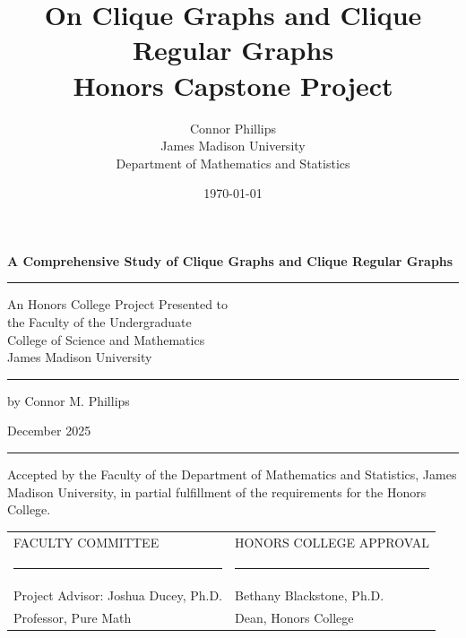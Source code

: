 \documentclass[12pt]{report}
\title{\Huge On Clique Graphs and Clique Regular Graphs \\[1em]
\Large  Honors Capstone Project}
\author{Connor Phillips \\[0.5em]
James Madison University\\
Department of Mathematics and Statistics}
\date{\today}
\theoremstyle{definition}
\begin{document}
\begin{titlepage}
\centering

{\large\bfseries
A Comprehensive Study of Clique Graphs and Clique Regular Graphs
\par}

\vspace{0.1in}
\noindent\rule{2.5in}{0.4pt}

\vspace{0.1in}

{\doublespacing An Honors College Project Presented to\\
the Faculty of the Undergraduate\\
College of Science and Mathematics\\
James Madison University\\}

\vspace{0.1in}
\noindent\rule{2.5in}{0.4pt}

\vspace{0.2in}

by Connor M. Phillips

\vspace{0.1in}

December 2025\\[0.2in]

\noindent\rule{\textwidth}{1.5pt}


{\raggedright\footnotesize\doublespacing Accepted by the Faculty of the Department of Mathematics and Statistics,
James Madison University, in partial fulfillment of the requirements
for the Honors College.\par}

\vspace{0.15in}

\begin{center}
\setlength{\tabcolsep}{15pt}
\renewcommand{\arraystretch}{0.75}
\begin{tabular}{p{2.5in} p{2.5in}}
{\scriptsize\raggedright FACULTY COMMITTEE\par} &  
{\scriptsize\raggedright HONORS COLLEGE APPROVAL\par} \\[0.2cm]

{\centering\rule{2in}{0.4pt}} & 
{\centering\rule{2in}{0.4pt}} \\
{\scriptsize\raggedright Project Advisor: Joshua Ducey, Ph.D.} & 
{\scriptsize\raggedright Bethany Blackstone, Ph.D.} \\
{\scriptsize\raggedright Professor, Pure Math} & 
{\scriptsize\raggedright Dean, Honors College} \\[0.2cm]


\end{tabular}
\end{center}
\end{titlepage}
\end{document}
